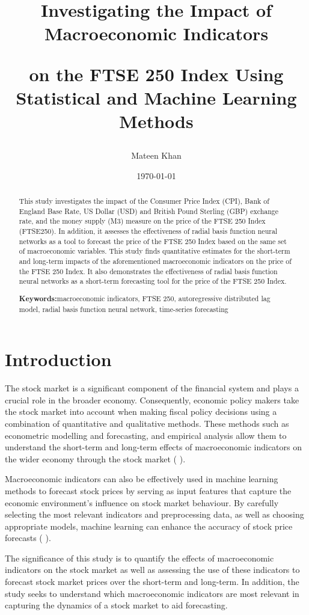 \documentclass[11pt,a4paper]{article}
\title{Investigating the Impact of Macroeconomic Indicators

on the FTSE 250 Index Using Statistical and Machine Learning Methods}
\author{Mateen Khan}
\date{\today}
\providecommand{\keywordname}{\textbf{Keywords:}} %
\newcommand{\keywords}[1]{%
  \par\addvspace{\baselineskip}%
  \noindent\keywordname\enspace\ignorespaces#1 %
}
\newcommand{\citeboth}[1]{\citeauthor{#1} \citep{#1}}
\begin{document}
\maketitle

\begin{abstract}
    This study investigates the impact of the Consumer Price Index (CPI), Bank of England Base Rate, US Dollar (USD) and British Pound Sterling (GBP) exchange rate, and the money supply (M3) measure on the price of the FTSE 250 Index (FTSE250).
    In addition, it assesses the effectiveness of radial basis function neural networks as a tool to forecast the price of the FTSE 250 Index based on the same set of macroeconomic variables. This study finds quantitative estimates for the short-term and long-term impacts of the aforementioned macroeconomic indicators on the price of the FTSE 250 Index. It also demonstrates the effectiveness of radial basis function neural networks as a short-term forecasting tool for the price of the FTSE 250 Index.
    \keywords{macroeconomic indicators, FTSE 250, autoregressive distributed lag model, radial basis function neural network, time-series forecasting}
\end{abstract}

\section{Introduction}

The stock market is a significant component of the financial system and 
plays a crucial role in the broader economy. Consequently, economic policy 
makers take the stock market into account when making fiscal policy 
decisions using a combination of quantitative and qualitative methods. 
These methods such as econometric modelling and forecasting, and empirical 
analysis allow them to understand the short-term and long-term effects of 
macroeconomic indicators
on the wider economy through the stock market (\citeboth{DemirgucKunt1996}).

Macroeconomic indicators can also be effectively used in machine learning 
methods to forecast stock prices by serving as input features that capture 
the economic environment’s influence on stock market behaviour. By carefully 
selecting the most relevant indicators and preprocessing data, 
as well as choosing appropriate models, machine learning can enhance the accuracy of stock price forecasts (\citeboth{Prasad2023}).

The significance of this study is to quantify the effects of macroeconomic indicators on the stock market as well as assessing the use of these indicators to forecast stock market prices over the short-term and long-term. In addition, the study seeks to understand which macroeconomic indicators are most relevant in capturing the dynamics of a stock market to aid forecasting.
\end{document}
